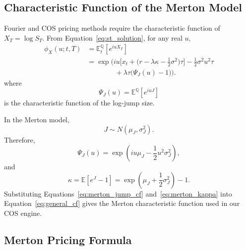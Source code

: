 \documentclass[12pt]{article}
\begin{document}
\subsection*{Characteristic Function of the Merton Model}

Fourier and COS pricing methods require the characteristic function of $X_T=\log S_T$. From Equation~\eqref{eq:st_solution}, for any real $u$,
\begin{equation}
\begin{aligned}
\phi_X(u;t,T)
&= \mathbb{E}_t^{\mathbb{Q}}\!\left[e^{iuX_T}\right] \\
&= \exp\!\Bigg(
iu\Big[x_t+\Big(r-\lambda\kappa-\tfrac12\sigma^2\Big)\tau\Big]
-\tfrac12\sigma^2u^2\tau \\
&\qquad\qquad
+\lambda\tau\big(\Psi_J(u)-1\big)
\Bigg).
\end{aligned}
\label{eq:general_cf}
\end{equation}
where
\begin{equation}
\Psi_J(u)=\mathbb{E}^{\mathbb{Q}}[e^{iuJ}]
\label{eq:jump_cf}
\end{equation}
is the characteristic function of the log-jump size.

In the Merton model,
\begin{equation}
J\sim N(\mu_J,\sigma_J^2).
\end{equation}
Therefore,
\begin{equation}
\Psi_J(u)=\exp\left(iu\mu_J-\frac12u^2\sigma_J^2\right),
\label{eq:merton_jump_cf}
\end{equation}
and
\begin{equation}
\kappa=\mathbb{E}[e^J-1]
=\exp\left(\mu_J+\frac12\sigma_J^2\right)-1.
\label{eq:merton_kappa}
\end{equation}
Substituting Equations~\eqref{eq:merton_jump_cf} and~\eqref{eq:merton_kappa} into Equation~\eqref{eq:general_cf} gives the Merton characteristic function used in our COS engine.

\subsection*{Merton Pricing Formula}
\end{document}
